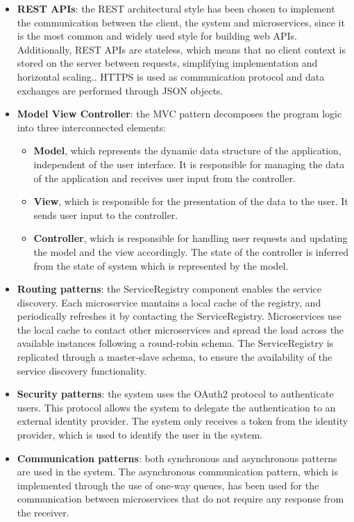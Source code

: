 \begin{itemize}
    \item \textbf{REST APIs}: the REST architectural style has been chosen to implement the communication between the client, the system and microservices, since it is the most common and widely used style for building web APIs.
    Additionally, REST APIs are stateless, which means that no client context is stored on the server between requests, simplifying implementation and horizontal scaling.. HTTPS is used as communication protocol and data exchanges are performed through JSON objects.
    \item \textbf{Model View Controller}: the MVC pattern decomposes the program logic into three interconnected elements:
    \begin{itemize}
        \item \textbf{Model}, which represents the dynamic data structure of the application, independent of the user interface. It is responsible for managing the data of the application and receives user input from the controller.
        \item \textbf{View}, which is responsible for the presentation of the data to the user. It sends user input to the controller.
        \item \textbf{Controller}, which is responsible for handling user requests and updating the model and the view accordingly. The state of the controller is inferred from the state of system which is represented by the model.
    \end{itemize}
    \item \textbf{Routing patterns}: the ServiceRegistry component enables the service discovery. Each microservice mantains a local cache of the registry, and periodically refreshes it by contacting the ServiceRegistry.
    Microservices use the local cache to contact other microservices and spread the load across the available instances following a round-robin schema.
    The ServiceRegistry is replicated through a master-slave schema, to ensure the availability of the service discovery functionality.
    \item \textbf{Security patterns}: the system uses the OAuth2 protocol to authenticate users. This protocol allows the system to delegate the authentication to an external identity provider. The system only receives a token from the identity provider, which is used to identify the user in the system.
    \item \textbf{Communication patterns}: both synchronous and asynchronous patterns are used in the system. The asynchronous communication pattern, which is implemented through the use of one-way queues, has been used for the communication between microservices that do not require any response from the receiver.

\end{itemize}
